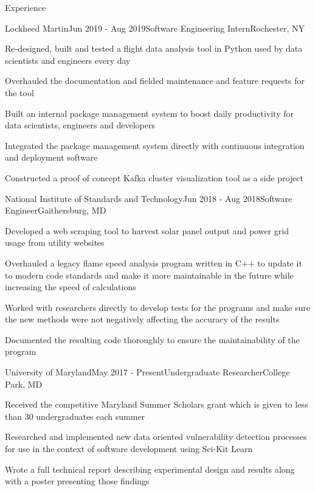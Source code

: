 \documentclass{resume} %
\begin{document}
\begin{rSection}{Experience}


\begin{rSubsection}{Lockheed Martin}{Jun 2019 - Aug 2019}{Software Engineering Intern}{Rochester, NY}
\item Re-designed, built and tested a flight data analysis tool in Python used by data scientists and engineers every day
\item Overhauled the documentation and fielded maintenance and feature requests for the tool
\item Built an internal package management system to boost daily productivity for data scientists, engineers and developers
\item Integrated the package management system directly with continuous integration and deployment software
\item Constructed a proof of concept Kafka cluster visualization tool as a side project
\end{rSubsection}


\begin{rSubsection}{National Institute of Standards and Technology}{Jun 2018 - Aug 2018}{Software Engineer}{Gaithersburg, MD}
\item Developed a web scraping tool to harvest solar panel output and power grid usage from utility websites
\item Overhauled a legacy flame speed analysis program written in C++ to update it to modern code standards and make it more maintainable in the future while increasing the speed of calculations
\item Worked with researchers directly to develop tests for the programs and make sure the new methods were not negatively affecting the accuracy of the results
\item Documented the resulting code thoroughly to ensure the maintainability of the program
\end{rSubsection}


\begin{rSubsection}{University of Maryland}{May 2017 - Present}{Undergraduate Researcher}{College Park, MD}
\item Received the competitive Maryland Summer Scholars grant which is given to less than 30 undergraduates each summer
\item Researched and implemented new data oriented vulnerability detection processes for use in the context of software development using Sci-Kit Learn
\item Wrote a full technical report describing experimental design and results along with a poster presenting those findings
\end{rSubsection}


\end{rSection}
\end{document}
